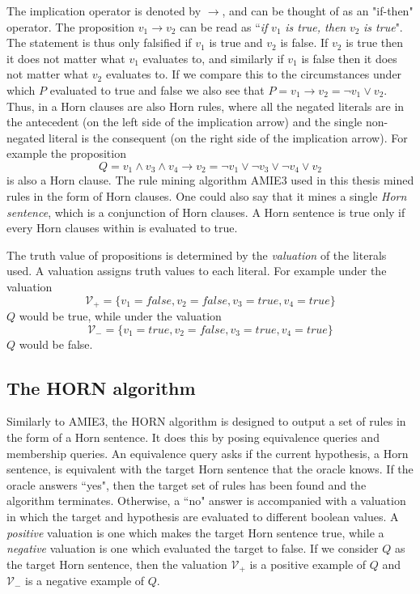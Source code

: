 The implication operator is denoted by $\rightarrow$, and can be thought of as an "if-then" operator. The proposition $v_1 \rightarrow v_2$ can be read as ``\textit{if} $v_1$\textit{ is true, then }$v_2$ \textit{is true}". The statement is thus only falsified if $v_1$ is true and $v_2$ is false. If $v_2$ is true then it does not matter what $v_1$ evaluates to, and similarly if $v_1$ is false then it does not matter what $v_2$ evaluates to. If we compare this to the circumstances under which $P$ evaluated to true and false we also see that $P = v_1 \rightarrow v_2 = \neg v_1 \vee v_2$. 
Thus, in a Horn clauses are also Horn rules, where all the negated literals are in the antecedent (on the left side of the implication arrow) and the single non-negated literal is the consequent (on the right side of the implication arrow). For example the proposition \[Q = v_1 \wedge v_3 \wedge v_4\rightarrow v_2 = \neg v_1 \vee \neg v_3 \vee \neg v_4\vee v_2\] is also a Horn clause. The rule mining algorithm AMIE3 used in this thesis mined rules in the form of Horn clauses. One could also say that it mines a single \textit{Horn sentence}, which is a conjunction of Horn clauses. A Horn sentence is true only if every Horn clauses within is evaluated to true.

The truth value of propositions is determined by the \textit{valuation} of the literals used. A valuation assigns truth values to each literal. For example under the valuation \[\mathcal{V_{+}}=\{v_1 = false, v_2 = false, v_3 = true, v_4 = true\}\] $Q$ would be true, while under the valuation \[\mathcal{V_{-}}=\{v_1 = true, v_2 = false, v_3 = true, v_4 = true\}\] $Q$ would be false.

\subsection{The HORN algorithm}
Similarly to AMIE3, the HORN algorithm is designed to output a set of rules in the form of a Horn sentence. It does this by posing equivalence queries and membership queries. An equivalence query asks if the current hypothesis, a Horn sentence, is equivalent with the target Horn sentence that the oracle knows. If the oracle answers ``yes", then the target set of rules has been found and the algorithm terminates. Otherwise, a ``no" answer is accompanied with a valuation in which the target and hypothesis are evaluated to different boolean values. A \textit{positive} valuation is one which makes the target Horn sentence true, while a \textit{negative} valuation is one which evaluated the target to false. If we consider $Q$ as the target Horn sentence, then the valuation $\mathcal{V}_{+}$ is a positive example of $Q$ and $\mathcal{V}_{-}$ is a negative example of $Q$.

